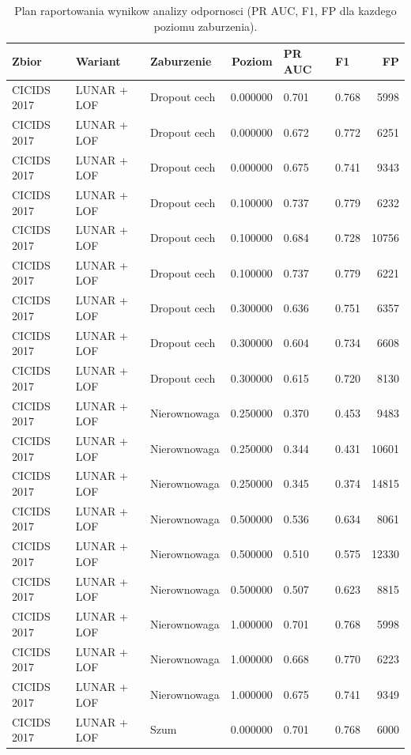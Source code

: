 \begin{table}
\caption{Plan raportowania wynikow analizy odpornosci (PR AUC, F1, FP dla kazdego poziomu zaburzenia).}
\label{tab:robustness_results}
\begin{tabular}{lllrllr}
\toprule
Zbior & Wariant & Zaburzenie & Poziom & PR AUC & F1 & FP \\
\midrule
CICIDS 2017 & LUNAR + LOF & Dropout cech & 0.000000 & 0.701 & 0.768 & 5998 \\
CICIDS 2017 & LUNAR + LOF & Dropout cech & 0.000000 & 0.672 & 0.772 & 6251 \\
CICIDS 2017 & LUNAR + LOF & Dropout cech & 0.000000 & 0.675 & 0.741 & 9343 \\
CICIDS 2017 & LUNAR + LOF & Dropout cech & 0.100000 & 0.737 & 0.779 & 6232 \\
CICIDS 2017 & LUNAR + LOF & Dropout cech & 0.100000 & 0.684 & 0.728 & 10756 \\
CICIDS 2017 & LUNAR + LOF & Dropout cech & 0.100000 & 0.737 & 0.779 & 6221 \\
CICIDS 2017 & LUNAR + LOF & Dropout cech & 0.300000 & 0.636 & 0.751 & 6357 \\
CICIDS 2017 & LUNAR + LOF & Dropout cech & 0.300000 & 0.604 & 0.734 & 6608 \\
CICIDS 2017 & LUNAR + LOF & Dropout cech & 0.300000 & 0.615 & 0.720 & 8130 \\
CICIDS 2017 & LUNAR + LOF & Nierownowaga & 0.250000 & 0.370 & 0.453 & 9483 \\
CICIDS 2017 & LUNAR + LOF & Nierownowaga & 0.250000 & 0.344 & 0.431 & 10601 \\
CICIDS 2017 & LUNAR + LOF & Nierownowaga & 0.250000 & 0.345 & 0.374 & 14815 \\
CICIDS 2017 & LUNAR + LOF & Nierownowaga & 0.500000 & 0.536 & 0.634 & 8061 \\
CICIDS 2017 & LUNAR + LOF & Nierownowaga & 0.500000 & 0.510 & 0.575 & 12330 \\
CICIDS 2017 & LUNAR + LOF & Nierownowaga & 0.500000 & 0.507 & 0.623 & 8815 \\
CICIDS 2017 & LUNAR + LOF & Nierownowaga & 1.000000 & 0.701 & 0.768 & 5998 \\
CICIDS 2017 & LUNAR + LOF & Nierownowaga & 1.000000 & 0.668 & 0.770 & 6223 \\
CICIDS 2017 & LUNAR + LOF & Nierownowaga & 1.000000 & 0.675 & 0.741 & 9349 \\
CICIDS 2017 & LUNAR + LOF & Szum & 0.000000 & 0.701 & 0.768 & 6000 \\

\end{tabular}
\end{table}
